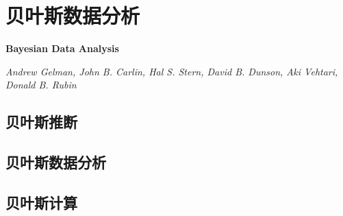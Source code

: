 \chapter{贝叶斯数据分析}
\Large\textbf{Bayesian Data Analysis}
\par \emph{Andrew Gelman, John B. Carlin, Hal S. Stern, David B. Dunson, Aki Vehtari, Donald B. Rubin} \normalsize

\section{贝叶斯推断}



\section{贝叶斯数据分析}

\section{贝叶斯计算}